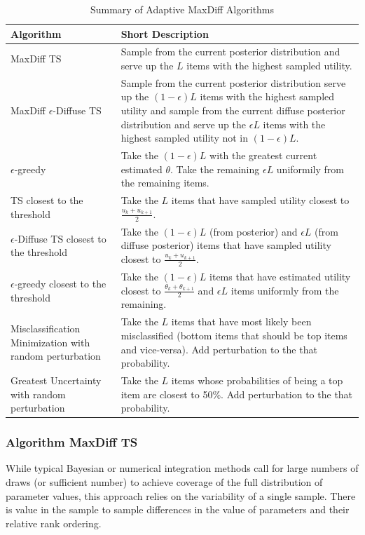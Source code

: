 \documentclass[nonblindrev]{informs3}
\begin{document}
\begin{table}[ht]
\caption{Summary of Adaptive MaxDiff Algorithms}
\begin{tabular}{p{5cm}|p{11cm}}
Algorithm & Short Description \\
\hline
MaxDiff TS & Sample from the current posterior distribution and serve up the $L$ items with the highest sampled utility.\\
MaxDiff $\epsilon$-Diffuse TS & Sample from the current posterior distribution serve up the $(1-\epsilon)L$ items with the highest sampled utility and sample from the current diffuse posterior distribution and serve up the $\epsilon L$ items with the highest sampled utility not in $(1-\epsilon)L$.\\
$\epsilon$-greedy & Take the $(1-\epsilon)L$ with the greatest current estimated $\theta$. Take the remaining $\epsilon L$ uniformily from the remaining items.\\
TS closest to the threshold & Take the $L$ items that have sampled utility closest to $\frac{u_k+u_{k+1}}{2}$.\\
$\epsilon$-Diffuse TS closest to the threshold & Take the $(1-\epsilon)L$ (from posterior) and  $\epsilon L$ (from diffuse posterior) items that have sampled utility closest to $\frac{u_k+u_{k+1}}{2}$.\\
$\epsilon$-greedy closest to the threshold & Take the $(1-\epsilon)L$ items that have estimated utility closest to $\frac{\theta_k+\theta_{k+1}}{2}$ and $\epsilon L$ items uniformly from the remaining.\\
Misclassification Minimization with random perturbation& Take the $L$ items that have most likely been misclassified (bottom items that should be top items and vice-versa). Add perturbation to the that probability.\\
Greatest Uncertainty with random perturbation& Take the $L$ items whose probabilities of being a top item are closest to 50\%. Add perturbation to the that probability.\\
\end{tabular}
\label{methods}
\end{table}



\subsubsection{Algorithm MaxDiff TS}

While typical Bayesian or numerical integration methods call for large numbers of draws (or sufficient number) to achieve coverage of the full distribution of parameter values, this  approach relies on the variability of a single sample. There is value in the sample to sample differences in the value of parameters and their relative rank ordering.  
\end{document}
